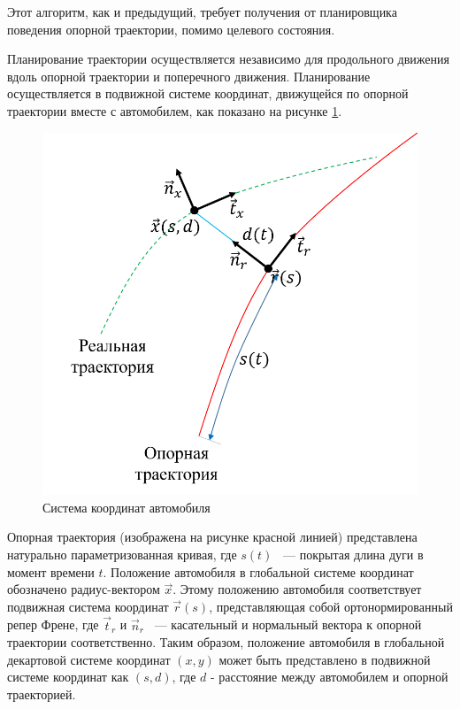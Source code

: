 Этот алгоритм, как и предыдущий, требует получения от планировщика поведения опорной траектории, помимо целевого
состояния.

Планирование траектории осуществляется независимо для продольного движения вдоль опорной траектории и поперечного
движения. Планирование осуществляется в подвижной системе координат, движущейся по опорной траектории вместе с
автомобилем, как показано на рисунке \ref{img:frenet_frame}.

\begin{figure}[h]
      \centering
      \includegraphics[]{images/frenet_frame}
      \caption{Система координат автомобиля}
      \label{img:frenet_frame}
\end{figure}

Опорная траектория (изображена на рисунке красной линией) представлена натурально параметризованная кривая, где $s(t)$
~--- покрытая длина дуги в момент времени $t$. Положение автомобиля в глобальной системе координат обозначено
радиус-вектором $\vec{x}$. Этому положению автомобиля соответствует подвижная система координат $\vec{r}(s)$,
представляющая собой ортонормированный репер Френе, где $\vec{t}_r$ и $\vec{n}_r$ ~--- касательный и нормальный вектора
к опорной траектории соответственно. Таким образом, положение автомобиля в глобальной декартовой системе координат
$(x, y)$ может быть представлено в подвижной системе координат как $(s, d)$, где $d$ - расстояние между автомобилем и
опорной траекторией.

